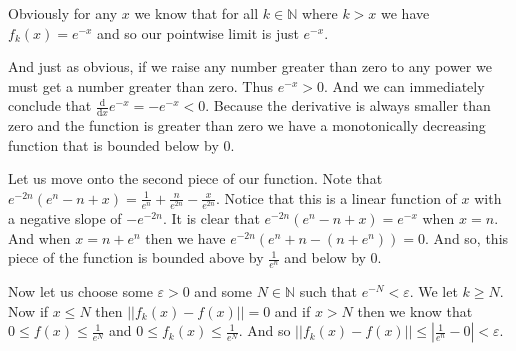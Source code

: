 \documentclass[letterpaper]{article}
\begin{document}
\begin{enumerate}
\begin{enumerate}
  Obviously for any $x$ we know that for all $k\in \mathbb{N}$ where $k>x$ we have $f_k(x)=e^{-x}$ and so our pointwise limit is just $e^{-x}$.

  And just as obvious, if we raise any number greater than zero to any power we must get a number greater than zero. Thus $e^{-x}>0$. And we can immediately conclude that $\frac{\mathrm{d}}{\mathrm{d}x}e^{-x}=-e^{-x}< 0$. Because the derivative is always smaller than zero and the function is greater than zero we have a monotonically decreasing function that is bounded below by $0$. 

  Let us move onto the second piece of our function.
  Note that $e^{-2n}(e^n-n+x)=\frac{1}{e^n}+\frac{n}{e^{2n}}-\frac{x}{e^{2n}}$.
  Notice that this is a linear function of $x$ with a negative slope of $-e^{-2n}$.
  It is clear that $e^{-2n}(e^n-n+x)=e^{-x}$ when $x=n$.
  And when $x=n+e^n$ then we have $e^{-2n}(e^n+n-(n+e^n))=0$.
  And so, this piece of the function is bounded above by $\frac{1}{e^n}$ and below by $0$.

  Now let us choose some $\varepsilon>0$ and some $N\in \mathbb{N}$ such that $e^{-N}<\varepsilon$. We let $k\ge N$. Now if $x\le N$ then $||f_k(x)-f(x)||=0$ and if $x>N$ then we know that $0\le f(x)\le \frac{1}{e^N}$ and $0\le f_k(x)\le \frac{1}{e^N}$. And so $||f_k(x)-f(x)||\le \left\lvert\frac{1}{e^n}-0\right\rvert<\varepsilon$.


\end{enumerate}
\end{enumerate}
\end{document}
